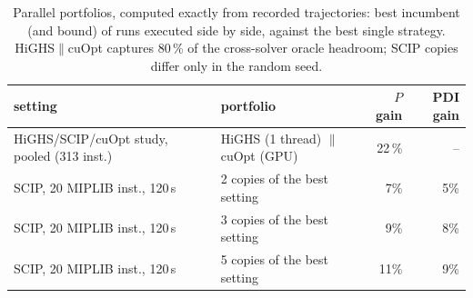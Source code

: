 \begin{table}[t]\centering\small
\begin{tabular}{llrr}
\toprule
setting & portfolio & $P$ gain & PDI gain \\
\midrule
HiGHS/SCIP/cuOpt study, pooled (313 inst.) & HiGHS (1 thread) $\|$ cuOpt (GPU) & 22\,\% & -- \\
SCIP, 20 MIPLIB inst., 120\,s & 2 copies of the best setting & 7\% & 5\% \\
SCIP, 20 MIPLIB inst., 120\,s & 3 copies of the best setting & 9\% & 8\% \\
SCIP, 20 MIPLIB inst., 120\,s & 5 copies of the best setting & 11\% & 9\% \\
\bottomrule
\end{tabular}
\caption{Parallel portfolios, computed exactly from recorded trajectories: best incumbent (and bound) of runs executed side by side, against the best single strategy. HiGHS$\|$cuOpt captures 80\,\% of the cross-solver oracle headroom; SCIP copies differ only in the random seed.}\label{tab:parallel}
\end{table}